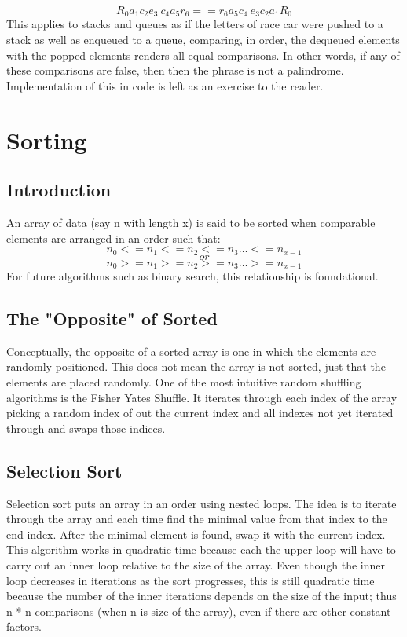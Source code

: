 \documentclass[letterpaper, 10pt]{article}
\begin{document}
\[R_0 a_1 c_2 e_3 \ c_4 a_5 r_6 == r_6 a_5 c_4 \ e_3 c_2 a_1 R_0\]
\noindent
This applies to stacks and queues as if the letters of race car were pushed to a stack
as well as enqueued to a queue, comparing, in order, the dequeued elements with the popped elements
renders all equal comparisons. In other words, if any of these comparisons are false, then then the phrase is not
a palindrome. Implementation of this in code is left as an exercise to the reader.

\section{Sorting}
\subsection{Introduction}
An array of data (say n with length x) is said to be sorted when comparable elements are arranged in an order
such that:
\[n_0 <= n_1 <= n_2 <= n_3 \dots <= n_{x-1} \]
\[or\]
\[n_0 >= n_1 >= n_2 >= n_3 \dots >= n_{x-1}\]
For future algorithms such as binary search, this relationship is foundational.
\subsection{The "Opposite" of Sorted}
Conceptually, the opposite of a sorted array is one in which the elements are
randomly positioned. This does not mean the array is not sorted, just that the elements
are placed randomly. One of the most intuitive random shuffling algorithms is the Fisher Yates Shuffle.
It iterates through each index of the array picking a random index of out the current index and all indexes
not yet iterated through and swaps those indices.

\subsection{Selection Sort}
Selection sort puts an array in an order using nested loops. The idea is to
iterate through the array and each time find the minimal value from that index to the end index.
After the minimal element is found, swap it with the current index. This algorithm works in quadratic time
because each the upper loop will have to carry out an inner loop relative to the size of the array.
Even though the inner loop decreases in iterations as the sort progresses, this is still quadratic time because
the number of the inner iterations depends on the size of the input; thus n * n comparisons (when n is size of the array),
even if there are other constant factors. 

\end{document}
